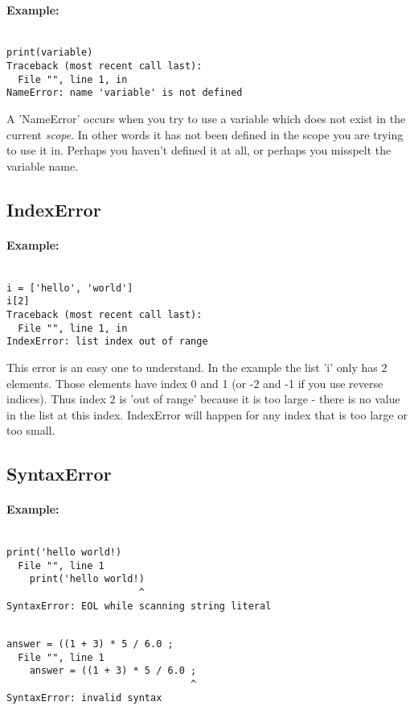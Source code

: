 \paragraph{Example:}
\begin{lstlisting}

print(variable)
Traceback (most recent call last):
  File "", line 1, in 
NameError: name 'variable' is not defined\end{lstlisting}

A 'NameError' occurs when you try to use a variable which does not exist in the current \textit{scope}. In other words                 it has not been defined in the scope you are trying to use it in. Perhaps you haven't defined it at all, or                 perhaps you misspelt the variable name.

\subsection{IndexError}

\paragraph{Example:}
\begin{lstlisting}

i = ['hello', 'world']
i[2]
Traceback (most recent call last):
  File "", line 1, in 
IndexError: list index out of range\end{lstlisting}

This error is an easy one to understand. In the example the list 'i' only has 2 elements. Those elements                 have index 0 and 1 (or -2 and -1 if you use reverse indices). Thus index 2 is 'out of range' because it is too large - there is no value in the list at this index.                 IndexError will happen for any index that is too large or too small.

\subsection{SyntaxError}

\paragraph{Example:}
\begin{lstlisting}

print('hello world!)
  File "", line 1
    print('hello world!)
                       ^
SyntaxError: EOL while scanning string literal\end{lstlisting}
\begin{lstlisting}

answer = ((1 + 3) * 5 / 6.0 ;
  File "", line 1
    answer = ((1 + 3) * 5 / 6.0 ;
                                ^
SyntaxError: invalid syntax\end{lstlisting}

